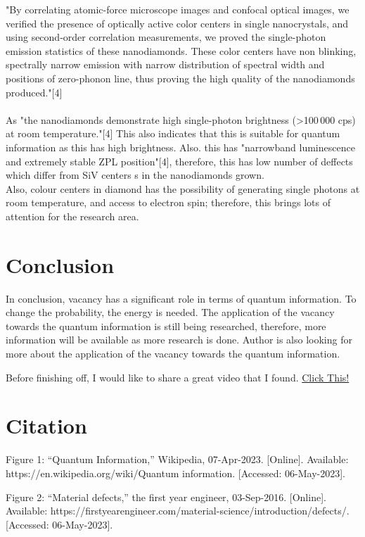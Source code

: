 \documentclass{article}
\begin{document}
"By correlating atomic-force microscope images and confocal optical images, we verified the presence of optically active color centers in single nanocrystals, and using second-order correlation measurements, we proved the single-photon emission statistics of these nanodiamonds. These color centers have non blinking, spectrally narrow emission with narrow distribution of spectral width and positions of zero-phonon line, thus proving the high quality of the nanodiamonds produced."[4]\\

\\
As "the nanodiamonds demonstrate high single-photon brightness (>100 000 cps) at room temperature."[4] This also indicates that this is suitable for quantum information as this has high brightness. Also. this has "narrowband luminescence and extremely stable ZPL position"[4], therefore, this has low number of deffects which differ from SiV centers s in the nanodiamonds grown.\\

Also, colour centers in diamond has the possibility of generating single photons at room temperature, and access to electron spin; therefore, this brings lots of attention for the research area. 
\section{Conclusion}
In conclusion, vacancy has a significant role in terms of quantum information. To change the probability, the energy is needed. The application of the vacancy towards the quantum information is still being researched, therefore, more information will be available as more research is done. 
Author is also looking for more about the application of the vacancy towards the quantum information. 

Before finishing off, I would like to share a great video that I found. 
\href{https://www.youtube.com/watch?v=KZIyG9II514}{Click This!} 

\section{Citation}
Figure 1: “Quantum Information,” Wikipedia, 07-Apr-2023. [Online]. Available: https://en.wikipedia.org/wiki/Quantum information. [Accessed: 06-May-2023]. 

Figure 2: “Material defects,” the first year engineer, 03-Sep-2016. [Online]. Available: https://firstyearengineer.com/material-science/introduction/defects/. [Accessed: 06-May-2023]. 
\end{document}
